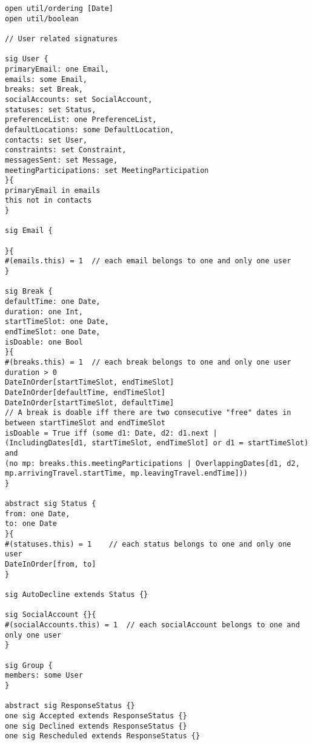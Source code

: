

\begin{lstlisting}[style=alloy]
open util/ordering [Date]
open util/boolean

// User related signatures

sig User {
primaryEmail: one Email,
emails: some Email,
breaks: set Break,
socialAccounts: set SocialAccount,
statuses: set Status,
preferenceList: one PreferenceList,
defaultLocations: some DefaultLocation,
contacts: set User,
constraints: set Constraint,
messagesSent: set Message,
meetingParticipations: set MeetingParticipation
}{
primaryEmail in emails
this not in contacts	
}

sig Email {

}{
#(emails.this) = 1	// each email belongs to one and only one user
}

sig Break {
defaultTime: one Date,
duration: one Int,
startTimeSlot: one Date,
endTimeSlot: one Date,
isDoable: one Bool
}{
#(breaks.this) = 1	// each break belongs to one and only one user
duration > 0
DateInOrder[startTimeSlot, endTimeSlot]
DateInOrder[defaultTime, endTimeSlot]
DateInOrder[startTimeSlot, defaultTime]
// A break is doable iff there are two consecutive "free" dates in between startTimeSlot and endTimeSlot
isDoable = True iff (some d1: Date, d2: d1.next |
(IncludingDates[d1, startTimeSlot, endTimeSlot] or d1 = startTimeSlot) and 
(no mp: breaks.this.meetingParticipations | OverlappingDates[d1, d2, mp.arrivingTravel.startTime, mp.leavingTravel.endTime]))
}

abstract sig Status {
from: one Date,
to: one Date
}{
#(statuses.this) = 1	// each status belongs to one and only one user
DateInOrder[from, to]
}

sig AutoDecline extends Status {}

sig SocialAccount {}{
#(socialAccounts.this) = 1	// each socialAccount belongs to one and only one user
}

sig Group {
members: some User
}

abstract sig ResponseStatus {}
one sig Accepted extends ResponseStatus {}
one sig Declined extends ResponseStatus {}
one sig Rescheduled extends ResponseStatus {}


\end{lstlisting}

